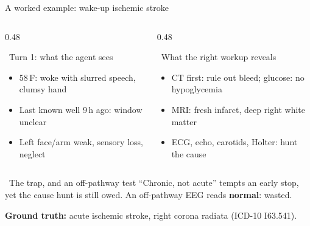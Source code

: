 \documentclass[aspectratio=169,t]{beamer}
\begin{document}
\begin{frame}{A worked example: wake-up ischemic stroke}
  \begin{columns}[T,onlytextwidth]
    \begin{column}{0.48\textwidth}
      \begin{block}{{\color{CERNblue}\faUserInjured}\;\, Turn 1: what the agent sees}
        \footnotesize
        \begin{itemize}\setlength\itemsep{0.15em}
          \item 58\,F: woke with slurred speech, clumsy hand
          \item Last known well 9\,h ago: window unclear
          \item Left face/arm weak, sensory loss, neglect
        \end{itemize}
      \end{block}
    \end{column}%
    \hfill
    \begin{column}{0.48\textwidth}
      \begin{alertblock}{{\color{CERNorange}\faVial}\;\, What the right workup reveals}
        \footnotesize
        \begin{itemize}\setlength\itemsep{0.15em}
          \item CT first: rule out bleed; glucose: no hypoglycemia
          \item MRI: fresh infarct, deep right white matter
          \item ECG, echo, carotids, Holter: hunt the cause
        \end{itemize}
      \end{alertblock}
    \end{column}
  \end{columns}

  \vspace{1mm}
  \begin{exampleblock}{{\color{CERNcyan}\faMinusCircle}\;\, The trap, and an off-pathway test}
    \footnotesize
    \alert{``Chronic, not acute''} tempts an early stop, yet the cause hunt is still owed. An off-pathway EEG reads \textbf{normal}: wasted.
  \end{exampleblock}

  \vspace{0.5mm}
  \centering\footnotesize\color{CERNnavy}
  {\faNotesMedical}\;\textbf{Ground truth:} acute ischemic stroke, right corona radiata (ICD-10 I63.541).
\end{frame}
\end{document}
